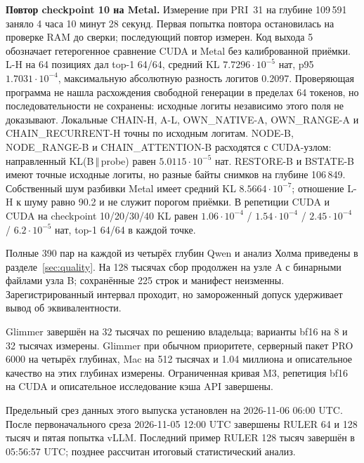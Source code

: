 \textbf{Повтор checkpoint 10 на Metal.} Измерение при PRI~31 на глубине 109\,591 заняло 4 часа 10 минут 28 секунд.
Первая попытка повтора остановилась на проверке RAM до сверки; последующий повтор измерен.
Код выхода 5 обозначает гетерогенное сравнение CUDA и Metal без калиброванной приёмки.
L-H на 64 позициях дал top-1 64/64, средний KL $7.7296\cdot10^{-5}$ нат, p95 $1.7031\cdot10^{-4}$,
максимальную абсолютную разность логитов 0.2097. Проверяющая программа не нашла расхождения свободной генерации
в пределах 64 токенов, но последовательности не сохранены: исходные логиты независимо этого поля не доказывают.
Локальные CHAIN-H, A-L, OWN\_NATIVE-A, OWN\_RANGE-A и CHAIN\_RECURRENT-H точны по исходным логитам.
NODE-B, NODE\_RANGE-B и CHAIN\_ATTENTION-B расходятся с CUDA-узлом: направленный KL(B\,$\Vert$\,probe)
равен $5.0115\cdot10^{-5}$ нат. RESTORE-B и BSTATE-B имеют точные исходные логиты,
но разные байты снимков на глубине 106\,849. Собственный шум разбивки Metal имеет средний KL $8.5664\cdot10^{-7}$;
отношение L-H к шуму равно 90.2 и не служит порогом приёмки.
В репетиции CUDA и CUDA на checkpoint 10/20/30/40 KL равен $1.06\cdot10^{-4}$ / $1.54\cdot10^{-4}$ /
$2.45\cdot10^{-4}$ / $6.2\cdot10^{-5}$ нат, top-1 64/64 в каждой точке.

Полные 390 пар на каждой из четырёх глубин Qwen и анализ Холма приведены в разделе~\ref{sec:quality}.
На 128 тысячах сбор продолжен на узле A с бинарными файлами узла B; сохранённые 225 строк и манифест неизменны.
Зарегистрированный интервал проходит, но замороженный допуск удерживает вывод об эквивалентности.

Glimmer завершён на 32 тысячах по решению владельца; варианты bf16 на 8 и 32 тысячах измерены.
Glimmer при обычном приоритете, серверный пакет PRO 6000 на четырёх глубинах, Mac на 512 тысячах и 1.04 миллиона
и описательное качество на этих глубинах измерены. Ограниченная кривая M3, репетиция bf16 на CUDA
и описательное исследование кэша API завершены.

Предельный срез данных этого выпуска установлен на 2026-11-06 06:00 UTC.
После первоначального среза 2026-11-05 12:00 UTC завершены RULER 64 и 128 тысяч и пятая попытка vLLM.
Последний пример RULER 128 тысяч завершён в 05:56:57 UTC; позднее рассчитан итоговый статистический анализ.

